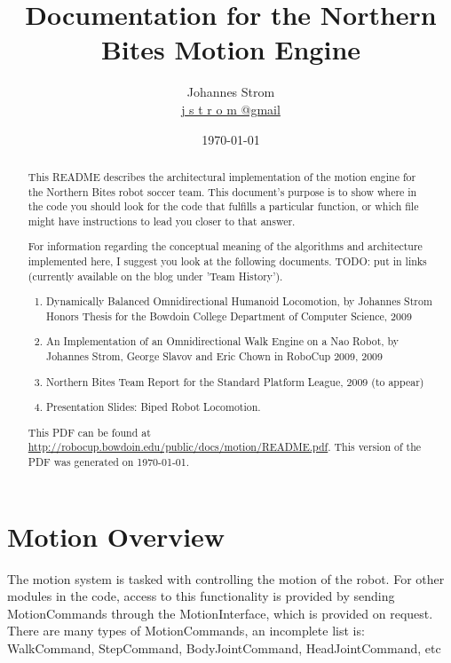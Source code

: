 \documentclass[11pt]{article}
\title{Documentation for the Northern Bites Motion Engine}
\author{Johannes Strom\\
\url{j s t r o m @gmail}}
\date{\today}
\begin{document}
\maketitle

\begin{abstract}
This README describes the architectural implementation of the motion engine for
the Northern Bites robot soccer team. This document's purpose is to show where
in the code you should look for the code that fulfills a particular function,
or which file might have instructions to lead you closer to that answer.

For information regarding the conceptual meaning of the algorithms and
architecture implemented here, I suggest you look at the following documents. TODO: put in links (currently available on the blog under 'Team History').
\begin{enumerate}
\item Dynamically Balanced Omnidirectional Humanoid Locomotion, by Johannes Strom
   Honors Thesis for the Bowdoin College Department of Computer Science, 2009
\item  An Implementation of an Omnidirectional Walk Engine on a Nao Robot, by
   Johannes Strom, George Slavov and Eric Chown in RoboCup 2009, 2009
\item Northern Bites Team Report for the Standard Platform League, 2009 (to appear)
\item Presentation Slides: Biped Robot Locomotion. %
\end{enumerate}

This PDF can be found at \url{http://robocup.bowdoin.edu/public/docs/motion/README.pdf}.
This version of the PDF was generated on \today.
\end{abstract}

\tableofcontents

\section{Motion Overview}
The motion system is tasked with controlling the motion of the robot. For other
modules in the code, access to this functionality is provided by sending
MotionCommands through the MotionInterface, which is provided on request.
There are many types of MotionCommands, an incomplete list is:
   WalkCommand, StepCommand, BodyJointCommand, HeadJointCommand, etc
\end{document}
